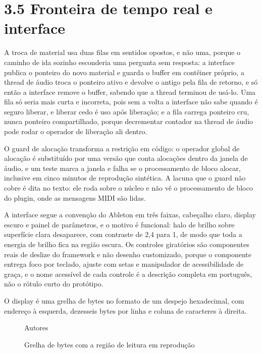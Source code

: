 \documentclass[11pt,a4paper]{article}
\begin{document}
\section*{3.5 Fronteira de tempo real e interface}

A troca de material usa duas filas em sentidos opostos, e não uma, porque o caminho de ida sozinho esconderia uma pergunta sem resposta: a interface publica o ponteiro do novo material e guarda o buffer em contêiner próprio, a thread de áudio troca o ponteiro ativo e devolve o antigo pela fila de retorno, e só então a interface remove o buffer, sabendo que a thread terminou de usá-lo. Uma fila só seria mais curta e incorreta, pois sem a volta a interface não sabe quando é seguro liberar, e liberar cedo é uso após liberação; e a fila carrega ponteiro cru, nunca ponteiro compartilhado, porque decrementar contador na thread de áudio pode rodar o operador de liberação ali dentro.


O guard de alocação transforma a restrição em código: o operador global de alocação é substituído por uma versão que conta alocações dentro da janela de áudio, e um teste marca a janela e falha se o processamento de bloco alocar, inclusive em cinco minutos de reprodução sintética. A lacuna que o guard não cobre é dita no texto: ele roda sobre o núcleo e não vê o processamento de bloco do plugin, onde as mensagens MIDI são lidas.


A interface segue a convenção do Ableton em três faixas, cabeçalho claro, display escuro e painel de parâmetros, e o motivo é funcional: halo de brilho sobre superfície clara desaparece, com contraste de 2,4 para 1, de modo que toda a energia de brilho fica na região escura. Os controles giratórios são componentes reais de deslize do framework e não desenho customizado, porque o componente entrega foco por teclado, ajuste com setas e manipulador de acessibilidade de graça, e o nome acessível de cada controle é a descrição completa em português, não o rótulo curto do protótipo.


O display é uma grelha de bytes no formato de um despejo hexadecimal, com endereço à esquerda, dezesseis bytes por linha e coluna de caracteres à direita.


\begin{figure}
\centering
\resizebox{0.92\textwidth}{!}{}
\caption{Grelha de bytes com a região de leitura em reprodução}
\label{fig:grelha}
{\footnotesize Autores\par}
\end{figure}
\end{document}
